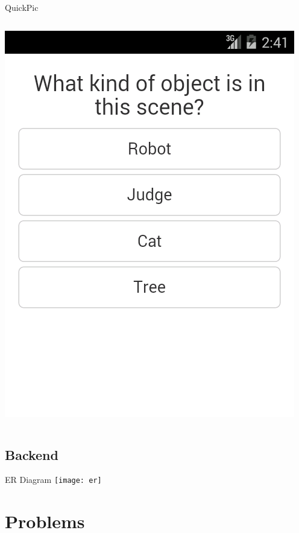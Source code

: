 \documentclass[aspectratio=169]{beamer}
\begin{document}
\begin{frame}{QuickPic}
\begin{columns}[c]
\begin{column}{0.5\columnwidth}
      \includegraphics[width=\textwidth,height=\textheight,keepaspectratio]{ss_quickpic_options}
    \end{column}
  \end{columns}
\end{frame}

\subsection{Backend}

\begin{frame}{ER Diagram}
  \centering
  \texttt{[image: er]}
\end{frame}

\section{Problems}
\end{document}
